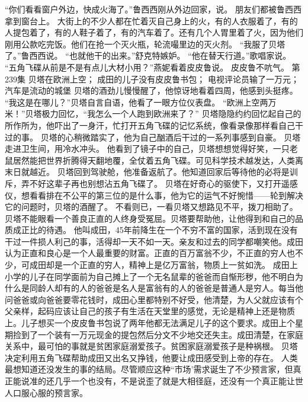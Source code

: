 \documentclass[a4paper,12pt,UTF8,twoside]{ctexbook}
\begin{document}
        “你们看看窗户外边，快成火海了。”鲁西西刚从外边回家，说。  
        朋友们都被鲁西西拿到窗台上。  
        大街上的不少人都在忙着灭自己身上的火，有的人衣服着了，有的人提包着了，有的人鞋子着了，有的汽车着了。还有几个人胃里着了火，因为他们刚用公款吃完饭。他们在抢一个灭火瓶，轮流嘬里边的灭火剂。  
        “我服了贝塔了。”鲁西西说。  
        “也就他干的出来。”舒克特嫉妒。  
        “他在替天行道。”歌唱家说。  
        “五角飞碟从前是不是有点儿大材小用？”燕妮看着皮皮鲁说。  
        皮皮鲁不吭气。          第239集  
        贝塔在欧洲上空；  
        成田的儿子没有皮皮鲁书包；  
        电视评论员输了一万元；  
        汽车是流动的城堡    
        贝塔的酒劲儿慢慢醒了，他惊讶地看着四周，他感到头挺疼。  
        “我这是在哪儿？”贝塔自言自语，他看了一眼方位仪表盘。  
        “欧洲上空两万米！”贝塔极力回忆，“我怎么一个人跑到欧洲来了？”  
        贝塔隐隐约约回忆起自己的所作所为，他吓出了一身汗，忙打开五角飞碟的记忆系统，像看录像那样看自己干过的事。  
        贝塔的心稍微踏实了，他为自己酗酒后干过的一系列事感到自豪。        
        贝塔走进卫生间，用冷水冲头。  
        他看到了镜子中的自己，贝塔想想觉得好笑，一只老鼠居然能把世界折腾得天翻地覆，全仗着五角飞碟。可见科学技术越发达，人类离末日就越近。  
        贝塔回到驾驶舱，他准备返航了。他知道回家后等待他的必将是训斥，弄不好这辈子再也别想沾五角飞碟了。  
        贝塔在好奇心的驱使下，又打开遥感仪，想看看排在不公平的第三位的是什么事，他为它的运气不好惋惜——轮到解决它的问题时，贝塔的酒醒了。  
        不看则已，一看贝塔又想路见不平，拨刀相助了。贝塔不能眼看一个善良正直的人终身受冤屈。贝塔要帮助他，让他得到和自己的品质成正比的待遇。  
        他叫成田，45年前降生在一个不穷不富的国家，活到现在没有干过一件损人利己的事，活得却一天不如一天。亲友和过去的同学都嘲笑他。成田认为正直和良心是一个人最重要的财富。正直的百万富翁不少，不正直的穷人也不少，可成田却是一个正直的穷人，精神上是亿万富翁，物质上一贫如洗。  
        成田上小学的儿子在同学面前为自己摊上了一个无名鼠辈的爸爸而自惭形秽，他不明白为什么是同龄人却有的人的爸爸是名人是富翁有的人的爸爸是普通人是穷人。每当他问爸爸或向爸爸要零花钱时，成田心里都特别不好受，他清楚，为人父就应该有个父亲样，起码应该让自己的孩子有生活在天堂里的感觉，无论是精神上还是物质上。儿子想买一个皮皮鲁书包说了两年他都无法满足儿子的这个要求。成田上个星期捡到了一个装有一万元现金的提包然后分文不少地交还失主。成田清楚，在家庭关系中，最可怕的事就是贫困家庭溺爱孩子。贫困家庭溺爱孩子是种祸根。  
        贝塔决定利用五角飞碟帮助成田又出名又挣钱，他要让成田感受到上帝的存在。  
        人类最想知道还没发生的事的结局。尽管顺应这种“市场’需求诞生了不少预言家，但真正能说准的还几乎一个也没有，不是说歪了就是大相径庭，还没有一个真正能让世人口服心服的预言家。  
\end{document}
